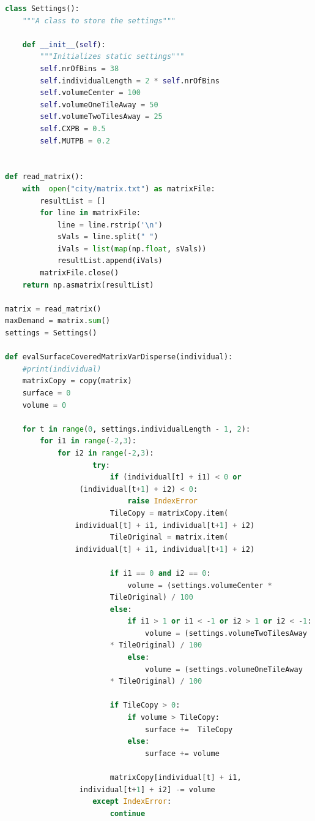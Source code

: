 \documentclass[a4paper,12pt]{report}
\begin{document}
\begin{lstlisting}[language=Python]
class Settings():
    """A class to store the settings"""
    
    def __init__(self):
        """Initializes static settings"""
        self.nrOfBins = 38
        self.individualLength = 2 * self.nrOfBins
        self.volumeCenter = 100
        self.volumeOneTileAway = 50
        self.volumeTwoTilesAway = 25
        self.CXPB = 0.5
        self.MUTPB = 0.2


def read_matrix():
    with  open("city/matrix.txt") as matrixFile:
        resultList = []
        for line in matrixFile:
            line = line.rstrip('\n')
            sVals = line.split(" ")
            iVals = list(map(np.float, sVals))
            resultList.append(iVals)
        matrixFile.close()
    return np.asmatrix(resultList)

matrix = read_matrix()
maxDemand = matrix.sum()
settings = Settings()

def evalSurfaceCoveredMatrixVarDisperse(individual):
    #print(individual)
    matrixCopy = copy(matrix)
    surface = 0
    volume = 0
    
    for t in range(0, settings.individualLength - 1, 2):
        for i1 in range(-2,3):
            for i2 in range(-2,3):
                    try:
                        if (individual[t] + i1) < 0 or
				 (individual[t+1] + i2) < 0:
                            raise IndexError
                        TileCopy = matrixCopy.item(
				individual[t] + i1, individual[t+1] + i2)
                        TileOriginal = matrix.item(
				individual[t] + i1, individual[t+1] + i2)
                        
                        if i1 == 0 and i2 == 0:
                            volume = (settings.volumeCenter * 
						TileOriginal) / 100
                        else:
                            if i1 > 1 or i1 < -1 or i2 > 1 or i2 < -1:
                                volume = (settings.volumeTwoTilesAway 
						* TileOriginal) / 100
                            else:
                                volume = (settings.volumeOneTileAway 
						* TileOriginal) / 100
                        
                        if TileCopy > 0:       
                            if volume > TileCopy:
                                surface +=  TileCopy
                            else:
                                surface += volume
                        
                        matrixCopy[individual[t] + i1,
				 individual[t+1] + i2] -= volume
                    except IndexError:
                        continue 
    

\end{lstlisting}
\end{document}
